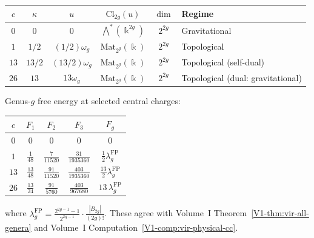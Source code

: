 \begin{computation}

\begin{center}
\renewcommand{\arraystretch}{1.3}
{\small
\begin{tabular}{cccccl}
\toprule
$c$ & $\kappa$ & $u$ & $\mathrm{Cl}_{2g}(u)$ &
$\dim$ & Regime \\
\midrule
$0$ & $0$ & $0$ &
$\bigwedge^*(\Bbbk^{2g})$ & $2^{2g}$ &
Gravitational \\
$1$ & $1/2$ & $(1/2)\omega_g$ &
$\mathrm{Mat}_{2^g}(\Bbbk)$ & $2^{2g}$ &
Topological \\
$13$ & $13/2$ & $(13/2)\omega_g$ &
$\mathrm{Mat}_{2^g}(\Bbbk)$ & $2^{2g}$ &
Topological (self-dual) \\
$26$ & $13$ & $13\omega_g$ &
$\mathrm{Mat}_{2^g}(\Bbbk)$ & $2^{2g}$ &
Topological (dual: gravitational) \\
\bottomrule
\end{tabular}
}
\end{center}

\medskip\noindent
Genus-$g$ free energy at selected central charges:
\begin{center}
\renewcommand{\arraystretch}{1.3}
{\small
\begin{tabular}{ccccc}
\toprule
$c$ & $F_1$ & $F_2$ & $F_3$ &
$F_g$ \\
\midrule
$0$ & $0$ & $0$ & $0$ & $0$ \\
$1$ & $\frac{1}{48}$ & $\frac{7}{11520}$ &
$\frac{31}{1935360}$ &
$\frac{1}{2}\lambda_g^{\mathrm{FP}}$ \\
$13$ & $\frac{13}{48}$ & $\frac{91}{11520}$ &
$\frac{403}{1935360}$ &
$\frac{13}{2}\lambda_g^{\mathrm{FP}}$ \\
$26$ & $\frac{13}{24}$ & $\frac{91}{5760}$ &
$\frac{403}{967680}$ &
$13\,\lambda_g^{\mathrm{FP}}$ \\
\bottomrule
\end{tabular}
}
\end{center}
where $\lambda_g^{\mathrm{FP}} = \frac{2^{2g-1}-1}{2^{2g-1}} \cdot
\frac{|B_{2g}|}{(2g)!}$. These agree with Volume~I
Theorem~\ref{V1-thm:vir-all-genera} and Volume~I
Computation~\ref{V1-comp:vir-physical-cc}.
\end{computation}

%
%

